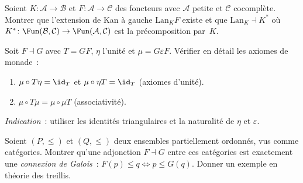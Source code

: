 \begin{exercice}\label{exo:adj-kan}
Soient $K\colon\mathcal{A}\to\mathcal{B}$ et $F\colon\mathcal{A}\to\mathcal{C}$
des foncteurs avec $\mathcal{A}$ petite et $\mathcal{C}$ cocomplète.
Montrer que l'extension de Kan à gauche $\mathrm{Lan}_K F$
existe et que $\mathrm{Lan}_K\dashv K^*$ où
$K^*\colon\Fun(\mathcal{B},\mathcal{C})\to\Fun(\mathcal{A},\mathcal{C})$
est la précomposition par~$K$.
\end{exercice}

\begin{exercice}\label{exo:adj-monade}
Soit $F\dashv G$ avec $T=GF$, $\eta$ l'unité et $\mu=G\varepsilon F$.
Vérifier en détail les axiomes de monade~:
\begin{enumerate}[label=(\alph*)]
\item $\mu\circ T\eta = \id_T$ et $\mu\circ\eta T = \id_T$
      (axiomes d'unité).
\item $\mu\circ T\mu = \mu\circ\mu T$ (associativité).
\end{enumerate}
\emph{Indication}~: utiliser les identités triangulaires et la
naturalité de $\eta$ et $\varepsilon$.
\end{exercice}

\begin{exercice}\label{exo:adj-galois}
Soient $(P,\leq)$ et $(Q,\leq)$ deux ensembles partiellement ordonnés,
vus comme catégories. Montrer qu'une adjonction $F\dashv G$
entre ces catégories est exactement une \emph{connexion de Galois}~:
$F(p)\leq q \Leftrightarrow p\leq G(q)$.
Donner un exemple en théorie des treillis.
\end{exercice}

